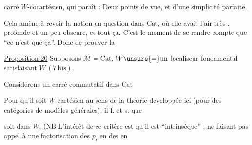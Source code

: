 
carré $W$-cocartésien, qui paraît  : Deux points de vue, et d'une simplicité parfaite.

Cela amène à revoir la notion en question dans $\mathrm{Cat}$, où elle avait l'air très , profonde et un peu obscure,  et tout ça. C'est le moment de se rendre compte que ``ce n'est que ça''. Donc de prouver la

\uline{Proposition 20} Supposons $\mathcal M=\mathrm{Cat}$, $W\unsure{=}\text{un}$ localiseur fondamental satisfaisant $W\,(7\ \mathrm{bis})$.

Considérons un carré commutatif dans $\mathrm{Cat}$


Pour qu'il soit $W$-cartésien au sens de la théorie  développée ici (pour des catégories de modèles générales), il f. et s. que


soit dans $W$. (NB L'intérêt de ce critère est qu'il est ``intrinsèque'' : ne faisant pas appel à une factorisation des $p_i$ en des  en


